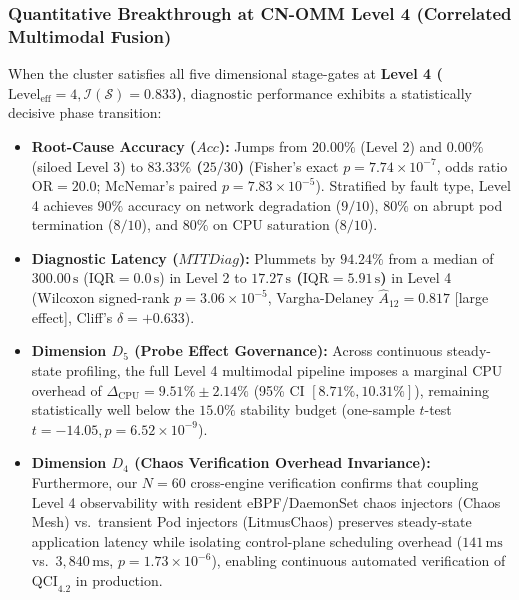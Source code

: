 \subsubsection{Quantitative Breakthrough at CN-OMM Level 4 (Correlated Multimodal Fusion)}
When the cluster satisfies all five dimensional stage-gates at \textbf{Level 4 ($\text{Level}_{\text{eff}} = 4, \mathcal{I}(\mathcal{S}) = 0.833$)}, diagnostic performance exhibits a statistically decisive phase transition:
\begin{itemize}[leftmargin=*, nosep]
    \item \textbf{Root-Cause Accuracy ($Acc$):} Jumps from $20.00\%$ (Level 2) and $0.00\%$ (siloed Level 3) to \textbf{$83.33\%$ ($25/30$)} (Fisher's exact $p = 7.74 \times 10^{-7}$, odds ratio $\text{OR} = 20.0$; McNemar's paired $p = 7.83 \times 10^{-5}$). Stratified by fault type, Level 4 achieves $90\%$ accuracy on network degradation ($9/10$), $80\%$ on abrupt pod termination ($8/10$), and $80\%$ on CPU saturation ($8/10$).
    \item \textbf{Diagnostic Latency ($MTTDiag$):} Plummets by \textbf{$94.24\%$} from a median of $300.00\,\text{s}$ ($\text{IQR} = 0.0\,\text{s}$) in Level 2 to \textbf{$17.27\,\text{s}$ ($\text{IQR} = 5.91\,\text{s}$)} in Level 4 (Wilcoxon signed-rank $p = 3.06 \times 10^{-5}$, Vargha-Delaney $\hat{A}_{12} = 0.817$ [large effect], Cliff's $\delta = +0.633$).
    \item \textbf{Dimension $D_5$ (Probe Effect Governance):} Across continuous steady-state profiling, the full Level 4 multimodal pipeline imposes a marginal CPU overhead of \textbf{$\Delta_{\text{CPU}} = 9.51\% \pm 2.14\%$} (95\% CI $[8.71\%, 10.31\%]$), remaining statistically well below the $15.0\%$ stability budget (one-sample $t$-test $t = -14.05, p = 6.52 \times 10^{-9}$).
    \item \textbf{Dimension $D_4$ (Chaos Verification Overhead Invariance):} Furthermore, our $N=60$ cross-engine verification confirms that coupling Level 4 observability with resident eBPF/DaemonSet chaos injectors (Chaos Mesh) vs.\ transient Pod injectors (LitmusChaos) preserves steady-state application latency while isolating control-plane scheduling overhead ($141\,\text{ms}$ vs.\ $3{,}840\,\text{ms}$, $p = 1.73 \times 10^{-6}$), enabling continuous automated verification of $\text{QCI}_{4.2}$ in production.
\end{itemize}

